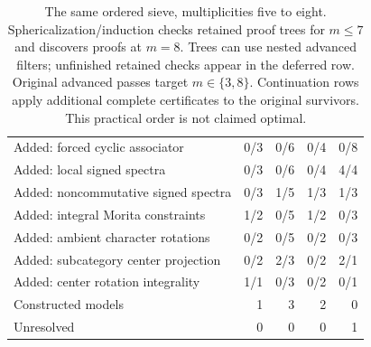 \begin{table}[p]
\begin{tabular*}{\textwidth}{@{\extracolsep{\fill}}lrrrr@{}}
Added: forced cyclic associator & 0/3 & 0/6 & 0/4 & 0/8\\
Added: local signed spectra & 0/3 & 0/6 & 0/4 & 4/4\\
Added: noncommutative signed spectra & 0/3 & 1/5 & 1/3 & 1/3\\
Added: integral Morita constraints & 1/2 & 0/5 & 1/2 & 0/3\\
Added: ambient character rotations & 0/2 & 0/5 & 0/2 & 0/3\\
Added: subcategory center projection & 0/2 & 2/3 & 0/2 & 2/1\\
Added: center rotation integrality & 1/1 & 0/3 & 0/2 & 0/1\\
\midrule
Constructed models & 1 & 3 & 2 & 0\\
Unresolved & 0 & 0 & 0 & 1\\
\bottomrule\end{tabular*}
\caption{The same ordered sieve, multiplicities five to eight. Sphericalization/induction checks retained proof trees for $m\le7$ and discovers proofs at $m=8$. Trees can use nested advanced filters; unfinished retained checks appear in the deferred row. Original advanced passes target $m\in\{3,8\}$. Continuation rows apply additional complete certificates to the original survivors. This practical order is not claimed optimal.}\label{tab:stages-high}
\end{table}
